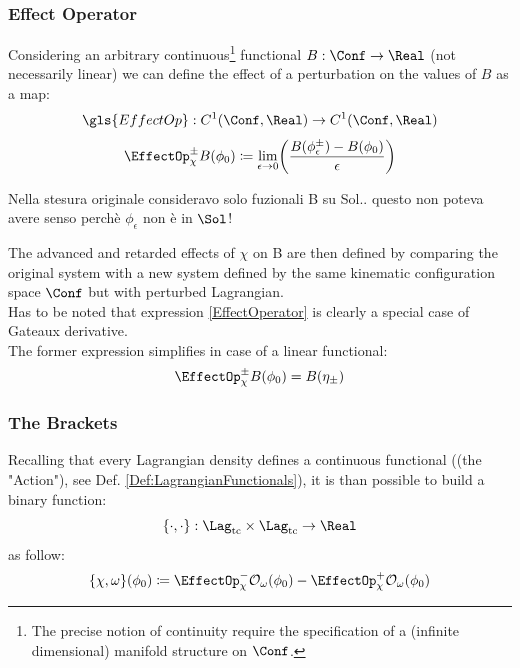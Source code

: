 \documentclass[Main]{subfiles}
\begin{document}
			
   		
		\subsubsection{Effect Operator}
		Considering an arbitrary continuous\footnote{The precise notion of continuity require the specification of a (infinite dimensional) manifold structure on $\Conf$.} functional $B: \Conf \rightarrow \Real$ (not necessarily linear) we can define the effect of a perturbation on the values of $B$\cite[pag. 5]{Marolf1993} as a map:
		\begin{displaymath}
			\gls{EffectOp} : C^1(\Conf,\Real) \rightarrow C^1(\Conf,\Real)
		\end{displaymath}
		\begin{equation}\label{EffectOperator}
		\EffectOp_\chi^\pm B ( \phi_0) 
		\coloneqq \lim_{\epsilon \rightarrow 0}
		 \biggr( \frac{B(\phi_\epsilon^\pm) - B (\phi_0)}{\epsilon} \biggr)
		\end{equation}
\ifToninus
	\begin{Warning}
		Nella stesura originale consideravo solo fuzionali B su Sol..  questo non poteva avere senso perchè $\phi_\epsilon$ non è in $\Sol$!
	\end{Warning}
\fi
		The advanced and retarded effects of $\chi$ on B are then defined by comparing the original system with a new system defined by the same kinematic configuration space $\Conf$ but with perturbed Lagrangian.
		\\
			Has to be noted that expression \ref{EffectOperator} is clearly a special case of Gateaux derivative.\cite{Blanchard2015}
		\\		
		The former expression simplifies in case of a linear functional:
			\begin{equation}\label{EffectOperatorLinear}
				\EffectOp_\chi^\pm B ( \phi_0) =  B(\eta_\pm)
			\end{equation}
		
		\subsubsection{The Brackets}
		Recalling that every Lagrangian density defines a continuous functional (\ifToninus (the "Action")\fi, see Def. \ref{Def:LagrangianFunctionals}), it is than possible to build a binary function:
		\begin{displaymath}
			\{\cdot,\cdot\}:\Lag_{\textrm{tc}} \times \Lag_{\textrm{tc}} \rightarrow \Real 	
		\end{displaymath}
		as follow:
		\begin{equation}\label{AbstractPeierlsBracket}
				\{\chi, \omega \}(\phi_0) \coloneqq \EffectOp_\chi^- \mathcal{O}_\omega (\phi_0) - \EffectOp_\chi^+ \mathcal{O}_\omega(\phi_0)
		\end{equation}
\end{document}

